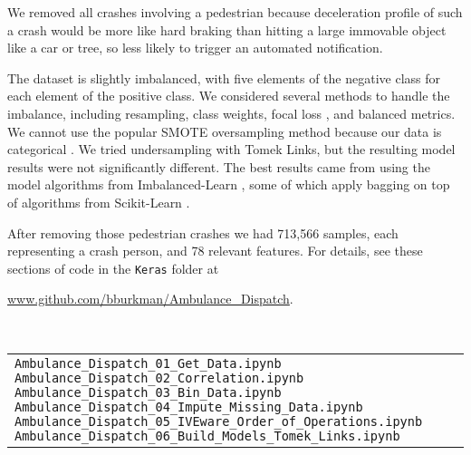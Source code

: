 We removed all crashes involving a pedestrian because deceleration profile of such a crash would be more like hard braking than hitting a large immovable object like a car or tree, so less likely to trigger an automated notification.  

The dataset is slightly imbalanced, with five elements of the negative class for each element of the positive class.  We considered several methods to handle the imbalance, including resampling, class weights, focal loss \citep{lin2017focal}, and balanced metrics.  We cannot use the popular SMOTE oversampling method because our data is categorical \citep{Chawla_2002}.  We tried undersampling with Tomek Links, but the resulting model results were not significantly different.  The best results came from using the model algorithms from Imbalanced-Learn \citep{Imblearn}, some of which apply bagging on top of algorithms from Scikit-Learn \citep{scikit-learn}.

After removing those pedestrian crashes we had 713,566 samples, each representing a crash person, and 78 relevant features.  For details, see these sections of code in the {\tt Keras} folder at 

\url{www.github.com/bburkman/Ambulance_Dispatch}.

\

\begin{tabular}{l}
	\verb|Ambulance_Dispatch_01_Get_Data.ipynb| \cr
	\verb|Ambulance_Dispatch_02_Correlation.ipynb| \cr
	\verb|Ambulance_Dispatch_03_Bin_Data.ipynb| \cr
	\verb|Ambulance_Dispatch_04_Impute_Missing_Data.ipynb| \cr
	\verb|Ambulance_Dispatch_05_IVEware_Order_of_Operations.ipynb| \cr
	\verb|Ambulance_Dispatch_06_Build_Models_Tomek_Links.ipynb| \cr
\end{tabular}


